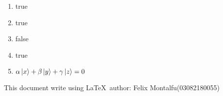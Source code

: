 \documentclass[a4paper]{article}
\begin{document}
  \begin{enumerate}[1.]
    \item true
    \item true
    \item false
    \item true
    \item $\alpha \ket{x} + \beta \ket{y} + \gamma \ket{z} = 0$
  \end{enumerate}
  This document write using \LaTeX \ author: Felix Montalfu(03082180055) 
\end{document}
